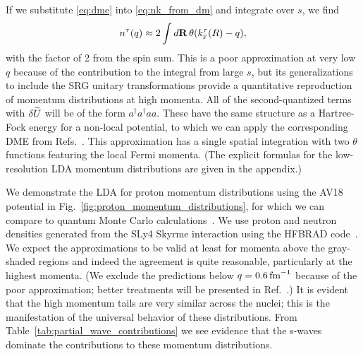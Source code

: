 \documentclass[10pt,aps,prc,floatfix,twocolumn,nofootinbib]{revtex4-1}
\begin{document}
If we substitute \eqref{eq:dme} into \eqref{eq:nk_from_dm} and integrate over $s$, we find
%
\begin{align}
    n^\tau(q) \approx 2 \int d\mathbf{R}\, \theta(k_{\scriptscriptstyle{\text F}}^\tau(R) - q),
\end{align}
%
with the factor of 2 from the spin sum.
This is a poor approximation at very low $q$ because of the contribution to the integral from large $s$,
but its generalizations to include the SRG unitary transformations provide a quantitative
reproduction of momentum distributions at high momenta.  
All of the second-quantized terms with $\delta \widetilde U$ will be of the form $a^\dagger a^\dagger a a$. 
These have the same structure as a Hartree-Fock energy for a non-local potential, to which we can apply the corresponding DME from Refs.~\cite{Negele:1972zp,Bogner:2008kj}.
This approximation has a single spatial integration with two $\theta$ functions featuring the local Fermi momenta.
(The explicit formulas for the low-resolution LDA momentum distributions are given in the appendix.)

We demonstrate the LDA for proton momentum distributions using the AV18 potential in Fig.~\ref{fig:proton_momentum_distributions}, for which we can compare to quantum Monte Carlo calculations~\cite{Wiringa:2013ala,Lonardoni:2017egu,Wiringa:single_distributions}.
We use proton and neutron densities generated from the SLy4 Skyrme interaction using the HFBRAD code~\cite{Bennaceur:2005mx}.
We expect the approximations to be valid at least for momenta above the gray-shaded regions and indeed the agreement is quite reasonable, particularly at the highest momenta.
(We exclude the predictions below $q = 0.6\,\mbox{fm}^{-1}$ because of the poor approximation; better treatments will be presented in Ref.~\cite{Tropiano:2021prep}.)
It is evident that the high momentum tails are very similar across the nuclei; this is the manifestation of the universal behavior of these distributions.
From Table~\ref{tab:partial_wave_contributions} we see evidence that the s-waves dominate the contributions to these momentum distributions.
\end{document}
